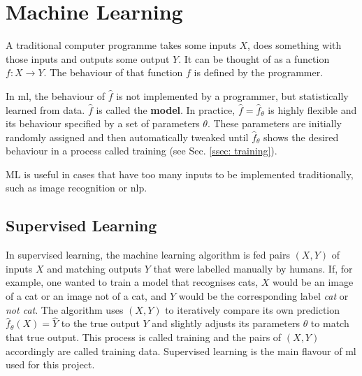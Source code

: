 \section{Machine Learning \label{sec: ML}}
    A traditional computer programme takes some inputs $X$, does something with those inputs and outputs some output $Y$. It can be thought of as a function $f: X \rightarrow Y$. The behaviour of that function $f$ is defined by the programmer.
    
    In \gls{ml}, the behaviour of $\hat{f}$ is not implemented by a programmer, but statistically learned from data. $\hat{f}$ is called the \textbf{\gls{model}}. In practice, $\hat{f} = \hat{f}_\theta$ is highly flexible and its behaviour specified by a set of parameters $\theta$. These parameters are initially randomly assigned and then automatically tweaked until $\hat{f}_\theta$ shows the desired behaviour in a process called training (see Sec. \ref{ssec: training}).
    
    ML is useful in cases that have too many inputs to be implemented traditionally, such as image recognition or \gls{nlp}.
    
    \subsection{Supervised Learning}
        In supervised learning, the machine learning algorithm is fed pairs $(X, Y)$ of inputs $X$ and matching outputs $Y$ that were labelled manually by humans. If, for example, one wanted to train a model that recognises cats, $X$ would be an image of a cat or an image not of a cat, and $Y$ would be the corresponding label \textit{cat} or \textit{not cat}. The algorithm uses $(X, Y)$ to iteratively compare its own prediction $\hat{f}_\theta(X) = \hat{Y}$ to the true output $Y$ and slightly adjusts its parameters $\theta$ to match that true output. This process is called training and the pairs of $(X, Y)$ accordingly are called training data. %
        Supervised learning is the main flavour of \gls{ml} used for this project.
        
